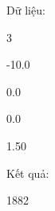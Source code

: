 Dữ liệu:  

   3   


   -10.0   


   0.0   


   0.0   


   1.50   







   Kết quả:  

   1882